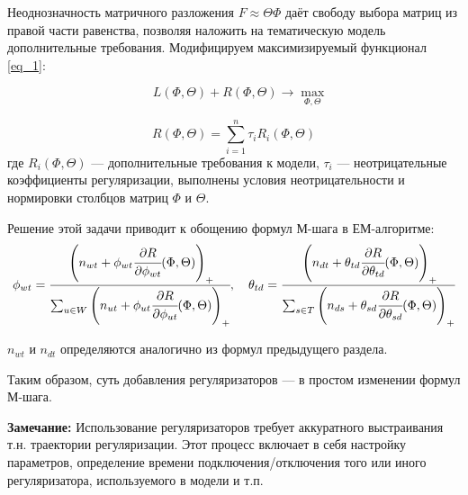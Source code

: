 Неоднозначность матричного разложения $F \approx \Theta \Phi$ даёт свободу выбора матриц из правой части равенства, позволяя наложить на тематическую модель дополнительные требования.  
Модифицируем максимизируемый функционал \ref{eq_1}:

\begin{equation}
	\quad L(\Phi,\Theta) + R(\Phi,\Theta) \rightarrow \max_{\Phi,\Theta}
\end{equation}	

\begin{equation}\label{reg_label}
 	R(\Phi,\Theta) = \sum_{i = 1}^{n} \tau_i R_i(\Phi,\Theta)
\end{equation}
где $R_i(\Phi,\Theta)$ --- дополнительные требования к модели, $\tau_i$ --- неотрицательные  коэффициенты регуляризации, выполнены условия неотрицательности и нормировки столбцов матриц $\Phi$ и $\Theta$.
 	 
Решение этой задачи приводит к обощению формул М-шага в ЕМ-алгоритме:
\begin{equation}
	\phi_{wt} = \cfrac{\left(n_{wt} + \phi_{wt} \cfrac{\partial R}{\partial \phi_{wt}} (\Phi,\Theta) \right)_+}{\sum_{u \in W} \left(n_{ut} + \phi_{ut} \cfrac{\partial R}{\partial \phi_{ut}} (\Phi,\Theta) \right)_+}, \quad 
 	\theta_{td} = \cfrac{\left(n_{dt} + \theta_{td} \cfrac{\partial R}{\partial \theta_{td}} (\Phi,\Theta) \right)_+}{\sum_{s \in T} \left(n_{ds} + \theta_{sd} \cfrac{\partial R}{\partial \theta_{sd}} (\Phi,\Theta) \right)_+}
\end{equation} 
 	 
 	 $n_{wt}$ и $n_{dt}$ определяются аналогично из формул предыдущего раздела.
 	 
Таким образом, суть добавления регуляризаторов --- в простом изменении формул М-шага.

{\bf Замечание:} Использование регуляризаторов требует аккуратного выстраивания т.н. траектории регуляризации. Этот процесс включает в себя настройку параметров, определение времени подключения/отключения того или иного регуляризатора, используемого в модели и т.п.